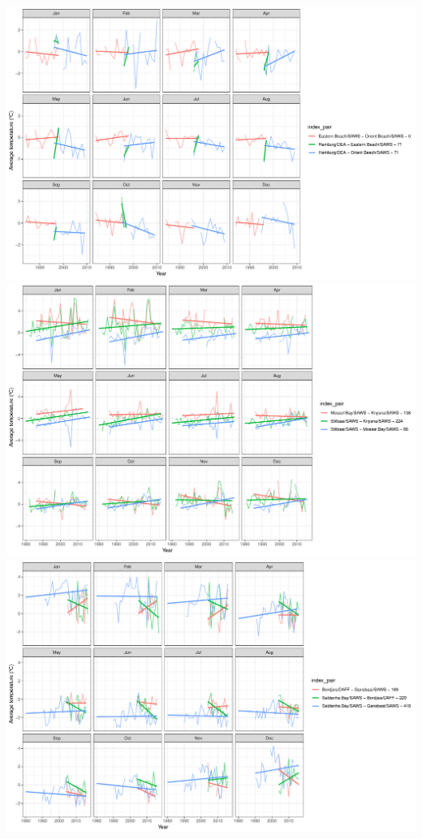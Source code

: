 \documentclass[12pt,A4paper,]{article}
\begin{document}
\includegraphics{../figures/SACTN_clust_1_plot2.pdf}
\includegraphics{../figures/SACTN_clust_2_plot2.pdf}
\includegraphics{../figures/SACTN_clust_3_plot2.pdf}
\end{document}
